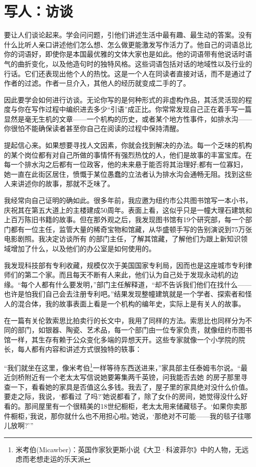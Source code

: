 \chapter{写人：访谈}
要让人们谈论起来。学会问问题，引他们讲述生活中最有趣、最生动的答案。没有什么比听人亲口讲述他们怎么想、怎么做更能激发写作活力了。他自己的词语总比你的词语好，即使你是本国最优雅的文体大家也是如此。他的词语带有他说话时语气的曲折变化，以及他造句时的独特风格。这些词语包括对话的地域性以及行业的行话。它们还表现出他个人的热忱。这是一个人在同读者直接对话，而不是通过了作者的过滤。作者一旦介入，其他人的经历就变成二手的了。

因此要学会如何进行访谈。无论你写的是何种形式的非虚构作品，其活灵活现的程度与你在写作过程中编织进去多少“引语”成正比。你常常发现自己正在着手写一篇显然是毫无生机的文章——一个机构的历史，或者某个地方性事件，如排水沟——你很怕不能确保读者甚至你自己在阅读的过程中保持清醒。

提起信心来。如果想要寻找人文因素，你就会找到解决的办法。每一个乏味的机构的某个岗位都有对自己所做的事情怀有强烈热忱的人，他们是故事的丰富宝库。在每一个排水沟之后都有一位政客，他的未来悬于能否将其治理好;都有一位寡妇，她一直在此街区居住，愤慨于某位愚蠢的立法者认为排水沟会通畅无阻。找到这些人来讲述你的故事，那就不乏味了。

我经常向自己证明的确如此。很多年前，我应邀为纽约市公共图书馆写一本小书，庆祝其在第五大道上的主楼建成50周年。表面上看，这似乎只是一幢大理石建筑和上百万陈旧书籍的故事。但在那外观之后，我发现图书馆有19个研究部，每一个部门都有一位主任，监管大量的稀奇宝物和馆藏，从华盛顿手写的告别演说到75万张电影剧照。我决定访谈所有 的部门主任，了解其馆藏，了解他们为跟上新知识领域增加了什么，以及他们的办公室是如何使用的。

我发现科技部有专利收藏，规模仅次于美国国家专利局，因而也是这座城市专利律师们的第二个家。而且每天不断有人来此，他们认为自己处于发现永动机的边缘。“每个人都有什么要发明，”部门主任解释道，“却不告诉我们他们在找什么——也许是怕我们自己会去注册专利吧。”结果发现整幢建筑就是一个学者、探索者和怪人的混合体，我的故事表面上看是一个机构的编年史，实际上是有关人的故事。

在一篇有关伦敦索思比拍卖行的长文中，我用了同样的方法。索思比也同样分为不同的部门，如银器、陶瓷、艺术品，每一个部门由一位专家负责，就像纽约市图书馆一样，其生存有赖于公众变化多端的异想天开。这些专家就像一个小学院的院长，每人都有内容和讲述方式很独特的轶事：

“我们就坐在这里，像米考伯\footnote{米考伯(Micawber)：英国作家狄更斯小说《大卫·科波菲尔》中的人物，无远虑而老想走运的乐天派}一样等待东西送进来，”家具部主任泰姆韦尔说。“最近剑桥附近有一个老太太写信说她要筹集两千英镑，问我能否去她 的房子那里寻查一下，看看她的家具是否值这么多钱。我去了，屋子里的家具绝对没什么价值。要走之际，我说，‘都看过 了吗?’她说都看了，除了女仆的房间，她觉得没什么好看的。那间屋里有一个很精美的18世纪橱柜，老太太用来储藏毯子。‘如果你卖那件橱柜，’我说，那你就什么也不用担心啦。’她说，‘那绝对不可能——我的毯子往哪儿放啊?’”

